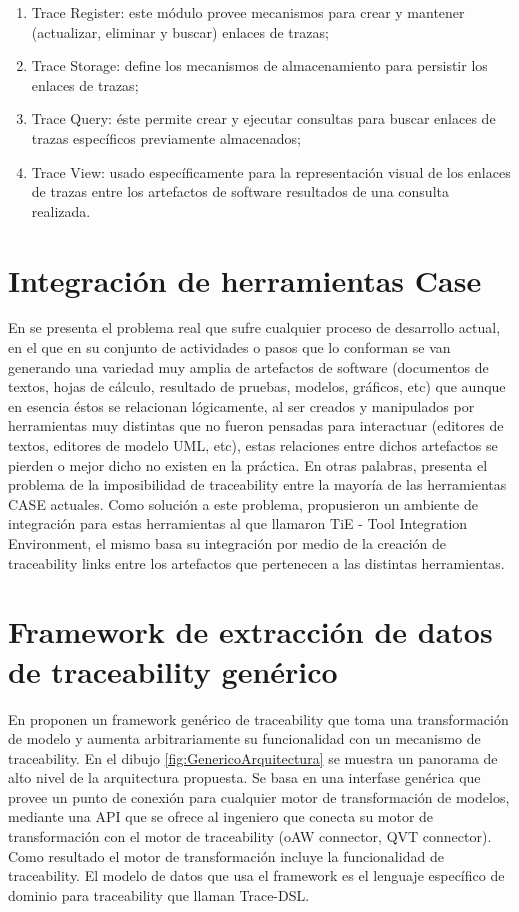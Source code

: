 \documentclass[a4paper,12pt,oneside]{book}
\begin{document}
\begin{enumerate}
\item    Trace Register: este módulo provee mecanismos para crear y mantener (actualizar, eliminar y buscar) enlaces de trazas;
\item     Trace Storage: define los mecanismos de almacenamiento para persistir los enlaces de trazas;
\item     Trace Query: éste permite crear y ejecutar consultas para buscar enlaces de trazas específicos previamente almacenados;
\item     Trace View: usado específicamente para la representación visual de los enlaces de trazas entre los artefactos de software resultados de una consulta realizada.
\end{enumerate}


\section{Integración de herramientas Case}

En \cite{KlarRoseSchurr} se presenta el problema real que sufre cualquier proceso de desarrollo actual, en el que en su conjunto de actividades o pasos que lo conforman se van generando una variedad muy amplia de artefactos de software (documentos de textos, hojas de cálculo, resultado de pruebas, modelos, gráficos, etc) que aunque en esencia éstos se relacionan lógicamente, al ser creados y manipulados por herramientas muy distintas que no fueron pensadas para interactuar (editores de textos, editores de modelo UML, etc), estas relaciones entre dichos artefactos se pierden o mejor dicho no existen en la práctica. En otras palabras, presenta el problema de la imposibilidad de traceability entre la mayoría de las herramientas CASE actuales. Como solución a este problema, propusieron un ambiente de integración para estas herramientas  al que llamaron TiE - Tool Integration Environment, el mismo basa su integración por medio de la creación de traceability links entre los artefactos que pertenecen a las distintas herramientas.

\section{Framework de extracción de datos de traceability genérico}

En \cite{GrammelKastenholz} proponen un framework genérico de traceability que toma una transformación de modelo y aumenta arbitrariamente su funcionalidad con un mecanismo de traceability. En el dibujo \ref{fig:GenericoArquitectura} se muestra un panorama de alto nivel de la arquitectura propuesta. Se basa en una interfase genérica que provee un punto de conexión para cualquier motor de transformación de modelos, mediante una API que se ofrece al ingeniero que conecta su motor de transformación con el motor de traceability (oAW connector, QVT connector). Como resultado el motor de transformación incluye la funcionalidad de traceability. El modelo de datos que usa el framework es el lenguaje específico de dominio para traceability que llaman Trace-DSL.
\end{document}
